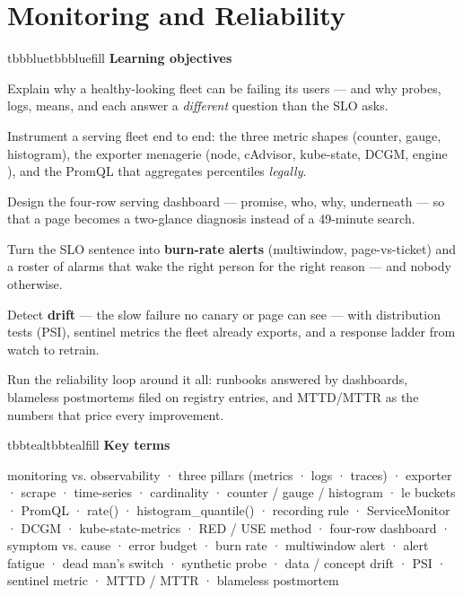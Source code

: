 \setcounter{chapter}{13}
\chapter{Monitoring and Reliability}

\begin{calloutbox}{tbbblue}{tbbbluefill}
{\normalsize\bfseries\color{tbbblue}Learning objectives}\par\vspace{3pt}
\begin{tbbitemize}
  \item Explain why a healthy-looking fleet can be failing its users — and why probes, logs, means, and  each answer a \textit{different} question than the SLO asks.
  \item Instrument a serving fleet end to end: the three metric shapes (counter, gauge, histogram), the exporter menagerie (node, cAdvisor, kube-state, DCGM, engine ), and the PromQL that aggregates percentiles \textit{legally}.
  \item Design the four-row serving dashboard — promise, who, why, underneath — so that a page becomes a two-glance diagnosis instead of a 49-minute search.
  \item Turn the SLO sentence into \textbf{burn-rate alerts} (multiwindow, page-vs-ticket) and a roster of alarms that wake the right person for the right reason — and nobody otherwise.
  \item Detect \textbf{drift} — the slow failure no canary or page can see — with distribution tests (PSI), sentinel metrics the fleet already exports, and a response ladder from watch to retrain.
  \item Run the reliability loop around it all: runbooks answered by dashboards, blameless postmortems filed on registry entries, and MTTD/MTTR as the numbers that price every improvement.
\end{tbbitemize}
\end{calloutbox}

\vspace{2.5pt}

\begin{calloutbox}{tbbteal}{tbbtealfill}
{\normalsize\bfseries\color{tbbteal}Key terms}\par\vspace{3pt}
monitoring vs. observability · three pillars (metrics · logs · traces) · exporter · scrape · time-series · cardinality · counter / gauge / histogram · le buckets · PromQL · rate() · histogram\_quantile() · recording rule · ServiceMonitor · DCGM · kube-state-metrics · RED / USE method · four-row dashboard · symptom vs. cause · error budget · burn rate · multiwindow alert · alert fatigue · dead man’s switch · synthetic probe · data / concept drift · PSI · sentinel metric · MTTD / MTTR · blameless postmortem
\end{calloutbox}

